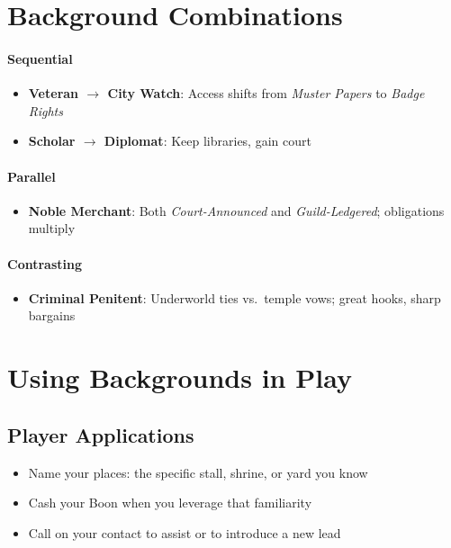 \begin{multicols}{2}
\section{Background Combinations}

\paragraph{Sequential}
\begin{itemize}
\item \textbf{Veteran $\rightarrow$ City Watch}: Access shifts from \textit{Muster Papers} to \textit{Badge Rights}
\item \textbf{Scholar $\rightarrow$ Diplomat}: Keep libraries, gain court
\end{itemize}

\paragraph{Parallel}
\begin{itemize}
\item \textbf{Noble Merchant}: Both \textit{Court-Announced} and \textit{Guild-Ledgered}; obligations multiply
\end{itemize}

\paragraph{Contrasting}
\begin{itemize}
\item \textbf{Criminal Penitent}: Underworld ties vs.\ temple vows; great hooks, sharp bargains
\end{itemize}

\section{Using Backgrounds in Play}

\subsection*{Player Applications}
\begin{itemize}
\item Name your places: the specific stall, shrine, or yard you know
\item Cash your Boon when you leverage that familiarity
\item Call on your contact to assist or to introduce a new lead
\end{itemize}


\end{multicols}
